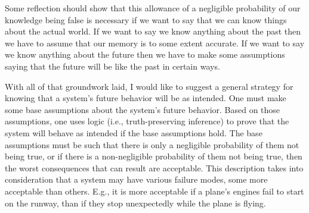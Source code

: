 \documentclass[11pt]{article}
\begin{document}
Some reflection should show that this allowance of a negligible probability
of our knowledge being false is necessary if we want to say that we can know things
about the actual world. If we want to say we know anything about the past then we have
to assume that our memory is to some extent accurate. If we want to say we know anything
about the future then we have to make some assumptions saying that the future will
be like the past in certain ways.

With all of that groundwork laid, I would like to suggest a general strategy for
knowing that a system's future behavior will be as intended. One must make some base
assumptions about the system's future behavior. Based on those assumptions, one uses
logic (i.e., truth-preserving inference) to prove that the system will behave as intended
if the base assumptions hold. The base assumptions must be such that there is only a
negligible probability of them not being true, or if there is a non-negligible probability
of them not being true, then the worst consequences that can result are acceptable.
This description takes into consideration that a system may have various failure modes,
some more acceptable than others. E.g., it is more acceptable if a plane's engines fail
to start on the runway, than if they stop unexpectedly while the plane is flying.
\end{document}
